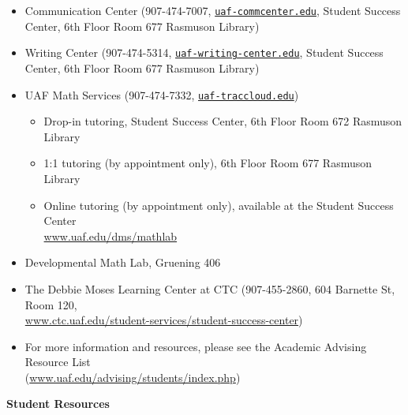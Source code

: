 \documentclass[12pt]{article}
\renewcommand{\emph}[1]{\textsf{\textbf{#1}}}
\newcommand{\localhead}[1]{\par\smallskip\textbf{#1} \smallskip\nobreak\\}%
\def\subheading#1{\localhead{\emph{#1}}}
\begin{document}
\vspace{-9mm}
\begin{itemize}
\setlength\itemsep{0em}
        \item Communication Center (907-474-7007, \href{mailto:uaf-commcenter@alaska.edu}{\texttt{uaf-commcenter\@@alaska.edu}}, Student Success Center, 6th Floor Room 677 Rasmuson Library)
        \item Writing Center (907-474-5314, \href{mailto:uaf-writing-center@alaska.edu}{\texttt{uaf-writing-center\@@alaska.edu}}, Student Success Center, 6th Floor Room 677 Rasmuson Library)
\item UAF Math Services (907-474-7332, \href{mailto:uaf-traccloud@alaska.edu}{\texttt{uaf-traccloud\@@alaska.edu}})

\begin{itemize}
\item Drop-in tutoring, Student Success Center, 6th Floor Room 672 Rasmuson Library

\item 1:1 tutoring (by appointment only), 6th Floor Room 677 Rasmuson Library

\item Online tutoring (by appointment only), available at the Student Success Center \\ \href{https://www.uaf.edu/dms/mathlab/}{www.uaf.edu/dms/mathlab}
\end{itemize}

\item Developmental Math Lab, Gruening 406
\item The Debbie Moses Learning Center at CTC (907-455-2860, 604 Barnette St, Room 120,\\ \href{https://www.ctc.uaf.edu/student-services/student-success-center/}{www.ctc.uaf.edu/student-services/student-success-center})
\item For more information and resources, please see the Academic Advising Resource List \\ (\href{https://www.uaf.edu/advising/students/index.php}{www.uaf.edu/advising/students/index.php})
\end{itemize}

\subheading{Student Resources}
\end{document}
